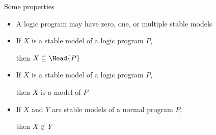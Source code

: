 \begin{frame}{Some properties}
  \bigskip
  \begin{itemize}
  \item<1-> A logic program may have zero, one, or multiple stable models
    \bigskip
  \item<2-> If $X$ is a stable model of a logic program $P$,

    then $X\subseteq\Head{P}$
    \medskip
  \item<2-> If $X$ is a stable model of a logic program $P$,

    then $X$ is a model of $P$
    \medskip
  \item<3-> If $X$ and $Y$ are stable models of a \alert{normal} program $P$,

    then $X\not\subset Y$
  \end{itemize}
\end{frame}
%
